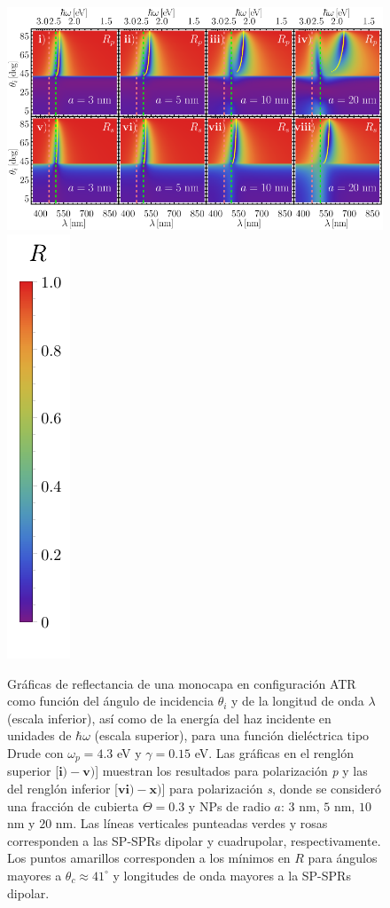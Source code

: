 	\begin{figure}[h!]\centering
\includegraphics[width = .75\linewidth]{2-Resultados/figs/3-Wp4rVar/0-2D_Grid}%
\includegraphics[scale=.85, trim={00 -5 00 00}, clip]{2-Resultados/figs/0-RBar_v}
	\caption{Gráficas de reflectancia de una monocapa en configuración ATR como función del ángulo de incidencia $\theta_i$ y de la longitud de onda $\lambda$ (escala inferior), así como de la energía del haz incidente en unidades de $\hbar\omega$ (escala superior), para una función dieléctrica tipo Drude con $\omega_p=4.3$ eV  y  $\gamma=0. 15$ eV.  Las gráficas   en el renglón superior [$\mathbf{i)-v)}$] muestran los resultados para  polarización \emph{p} y las del renglón inferior  [$\mathbf{vi)-x)}$]  para polarización  \emph{s}, donde se consideró una fracción de cubierta $\Theta = 0.3$ y  NPs de radio  $a$: $3$ nm, $5$ nm, $10$ nm y $20$ nm.  Las líneas verticales punteadas verdes y rosas corresponden a las SP-SPRs dipolar y  cuadrupolar, respectivamente.  Los puntos amarillos corresponden a los mínimos en $R$ para ángulos mayores a $\theta_c\approx 41^\circ$ y longitudes de onda mayores a la SP-SPRs dipolar.
}	\label{fig:R-RVar}	
	\end{figure}	

